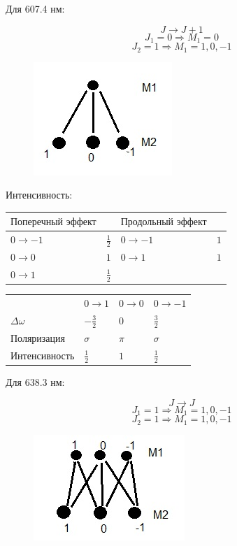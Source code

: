 Для 607.4 нм:

$$J \rightarrow J+1$$
$$J_1=0 \Rightarrow M_1=0$$
$$J_2=1 \Rightarrow M_1=1,0,-1$$
\begin{figure}[H]
	\centering
	\includegraphics[width=0.3\linewidth]{fig/fig12}
	\caption{}
	\label{fig:fig14}
\end{figure}
Интенсивность:

\begin{tabular}{ | l | l | l | l |}
\hline
$\text{Поперечный эффект}$ & $ $ & $\text{Продольный эффект}$ & $ $ \\ \hline
$0 \rightarrow -1$ & $\frac12$ & $0 \rightarrow -1$ & $1$\\
$0 \rightarrow 0$ & $1$ & $0 \rightarrow 1$ & $1$\\
$0 \rightarrow 1$ & $\frac12$ & $ $ & $ $\\
\hline
\end{tabular}

\begin{tabular}{ | l | l | l | l |}
\hline
$ $ & $0 \rightarrow 1$ & $0 \rightarrow 0$ & $0 \rightarrow -1$ \\
$\Delta \omega$ & $-\frac32$ & $0$ & $\frac32$ \\
$\text{Поляризация}$ & $\sigma$ & $\pi$ & $\sigma$\\
$\text{Интенсивность}$ & $\frac12$ & $1$ & $\frac12$\\
\hline
\end{tabular}

Для 638.3 нм:

$$J \rightarrow J$$
$$J_1=1 \Rightarrow M_1=1,0,-1$$
$$J_2=1 \Rightarrow M_1=1,0,-1$$
\begin{figure}[H]
	\centering
	\includegraphics[width=0.3\linewidth]{fig/fig14}
	\caption{}
	\label{fig:fig15}
\end{figure}

